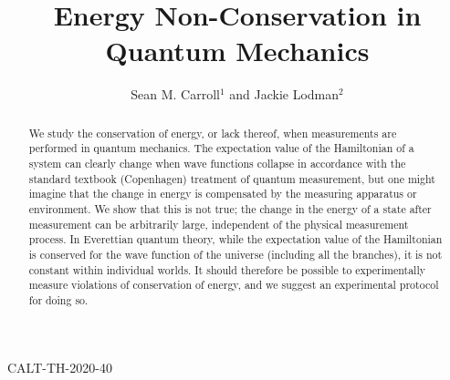 \documentclass[aps,prd,onecolumn,nofootinbib,notitlepage]{revtex4-1}
\begin{document}
\baselineskip=13pt
\hfill CALT-TH-2020-40
\hfill

\vspace{0.5cm}
\thispagestyle{empty}

\newcommand{\be}{\begin{equation}}
\newcommand{\ee}{\end{equation}}
\newcommand{\bea}{\begin{eqnarray}}
\newcommand{\eea}{\end{eqnarray}}
\newcommand{\hst}{\widetilde{\mathcal{H}}} 
\newcommand{\iso}{\dot{=}}
\newcommand{\Dim}{\mathrm{dim\,}}
\newcommand{\Tr}{\mathrm{Tr}}
\newcommand{\hs}{\mathcal{H}} 
\newcommand{\ham}{\widehat{H}}
\newcommand{\intham}{\widehat{H}_{\rm{int}}}
\newcommand{\selfham}{\widehat{H}_{\rm{self}}}
\def\bra#1{\langle #1\rvert}
\def\ket#1{\lvert #1\rangle}
\newcommand{\draftnote}[1]{\textbf{\color{red}[#1]}}
\newcommand{\psiuu}{\psi_{\uparrow\uparrow}}
\newcommand{\psiud}{\psi_{\uparrow\downarrow}}
\newcommand{\psidu}{\psi_{\downarrow\uparrow}}
\newcommand{\psidd}{\psi_{\downarrow\downarrow}}


\title{Energy Non-Conservation in Quantum Mechanics}
\author{Sean M. Carroll$^1$ and Jackie Lodman$^2$}

\begin{abstract}
We study the conservation of energy, or lack thereof, when measurements are performed in quantum mechanics.
The expectation value of the Hamiltonian of a system can clearly change when wave functions collapse in accordance with the standard textbook (Copenhagen) treatment of quantum measurement, but one might imagine that the change in energy is compensated by the measuring apparatus or environment.
We show that this is not true; the change in the energy of a state after measurement can be arbitrarily large, independent of the physical measurement process.
In Everettian quantum theory, while the expectation value of the Hamiltonian is conserved for the wave function of the universe (including all the branches), it is not constant within individual worlds.
It should therefore be possible to experimentally measure violations of conservation of energy, and we suggest an experimental protocol for doing so.
\end{abstract}
\end{document}
